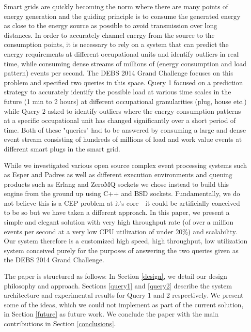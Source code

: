Smart grids are quickly becoming the norm where there are many points of energy generation and the guiding principle is to consume the generated energy as close to the energy source as possible to avoid transmission over long distances.
In order to accurately channel energy from the source to the consumption points, it is necessary to rely on a system that can predict the energy requirements at different occupational units and identify outliers in real time, while consuming dense streams of millions of (energy consumption and load pattern) events per second.
The DEBS 2014 Grand Challenge focuses on this problem and specified two queries in this space.
Query 1 focused on a prediction strategy to accurately identify the possible load at various time scales in the future (1 min to 2 hours) at different occupational granularities (plug, house etc.) while Query 2 asked to identify outliers where the energy consumption patterns at a specific occupational unit has changed significantly over a short period of time.
Both of these "queries" had to be answered by consuming a large and dense event stream consisting of hundreds of millions of load and work value events at different smart plugs in the smart grid.


While we investigated various open source complex event processing systems such as Esper\cite{Esper} and Padres\cite{Padres} as well as different execution environments and queuing products such as Erlang\cite{erlang} and  ZeroMQ sockets \cite{zeromq} we chose instead to build this engine from the ground up using C++ and BSD sockets.
Fundamentally, we do not believe this is a CEP problem at it's core - it could be artificially conceived to be so but we have taken a different approach.
In this paper, we present a simple and elegant solution with very high throughput rate (of over a million events per second at a very low CPU utilization of under 20\%) and scalability.
Our system therefore is a customized high speed, high throughput, low utilization system conceived purely for the purposes of answering the two queries given as the DEBS 2014 Grand Challenge.


The paper is structured as follows: In Section \ref{design}, we detail our design philosophy and approach.
Sections \ref{query1} and \ref{query2} describe the system architecture and experimental results for Query 1 and 2 respectively.
We present some of the ideas, which we could not implement as part of the current solution, in Section \ref{future} as future work.
We conclude the paper with the main contributions in Section \ref{conclusions}.
